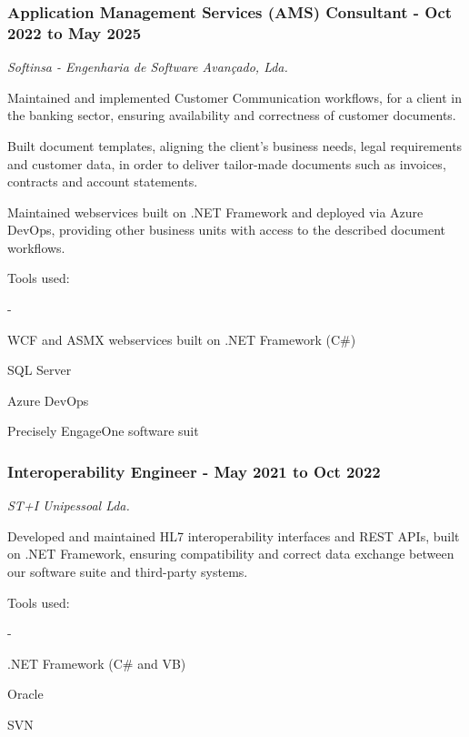 \documentclass[a4paper,11pt]{article}
\renewenvironment{itemize}{
  \begin{list}
    {-}
    {
      \setlength{\leftmargin}{1em}
      \setlength{\itemsep}{-0.3em}
      \setlength{\parskip}{0em}
      \setlength{\parsep}{0em}
    }
}{
  \end{list}
}
\begin{document}
    \subsubsection{Application Management Services (AMS) Consultant -
    Oct 2022 to May
    2025}\label{application-management-services-ams-consultant---oct-2022-to-may-2025}

    \emph{Softinsa - Engenharia de Software Avançado, Lda.}

    Maintained and implemented Customer Communication workflows, for a
    client in the banking sector, ensuring availability and correctness
    of customer documents.

    Built document templates, aligning the client's business needs,
    legal requirements and customer data, in order to deliver
    tailor-made documents such as invoices, contracts and account
    statements.

    Maintained webservices built on .NET Framework and deployed via
    Azure DevOps, providing other business units with access to the
    described document workflows.

    Tools used:

    \begin{itemize}
    \item
      WCF and ASMX webservices built on .NET Framework (C\#)
    \item
      SQL Server
    \item
      Azure DevOps
    \item
      Precisely EngageOne software suit
    \end{itemize}

    \subsubsection{Interoperability Engineer - May 2021 to Oct
    2022}\label{interoperability-engineer---may-2021-to-oct-2022}

    \emph{ST+I Unipessoal Lda.}

    Developed and maintained HL7 interoperability interfaces and REST
    APIs, built on .NET Framework, ensuring compatibility and correct
    data exchange between our software suite and third-party systems.

    Tools used:

    \begin{itemize}
    \item
      .NET Framework (C\# and VB)
    \item
      Oracle
    \item
      SVN
    \end{itemize}
\end{document}
